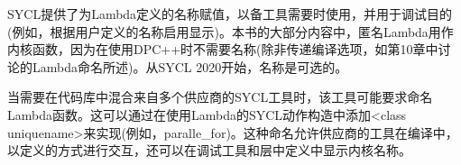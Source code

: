 SYCL提供了为Lambda定义的名称赋值，以备工具需要时使用，并用于调试目的(例如，根据用户定义的名称启用显示)。本书的大部分内容中，匿名Lambda用作内核函数，因为在使用DPC++时不需要名称(除非传递编译选项，如第10章中讨论的Lambda命名所述)。从SYCL 2020开始，名称是可选的。\par

当需要在代码库中混合来自多个供应商的SYCL工具时，该工具可能要求命名Lambda函数。这可以通过在使用Lambda的SYCL动作构造中添加<class uniquename>来实现(例如，paralle\_for)。这种命名允许供应商的工具在编译中，以定义的方式进行交互，还可以在调试工具和层中定义中显示内核名称。\par